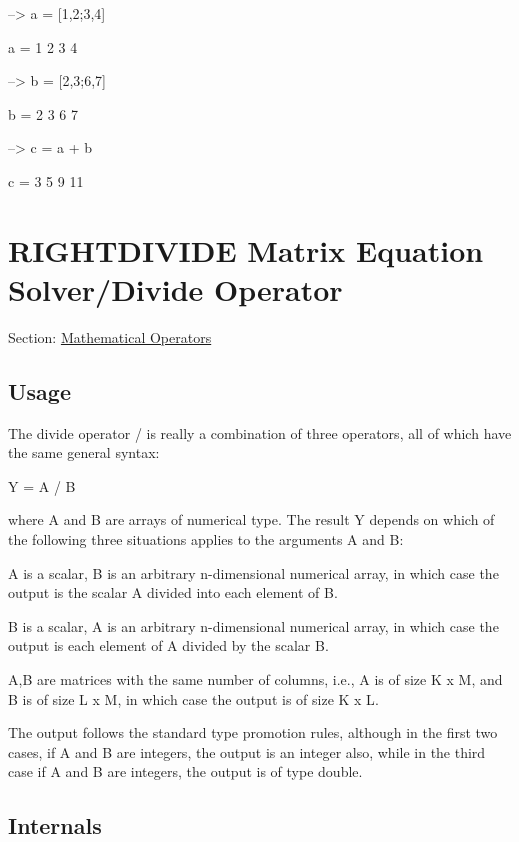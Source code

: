 \begin{DoxyVerbInclude}
--> a = [1,2;3,4]

a = 
 1 2 
 3 4 

--> b = [2,3;6,7]

b = 
 2 3 
 6 7 

--> c = a + b

c = 
  3  5 
  9 11 
\end{DoxyVerbInclude}
 \hypertarget{operators_rightdivide}{}\section{R\-I\-G\-H\-T\-D\-I\-V\-I\-D\-E Matrix Equation Solver/\-Divide Operator}\label{operators_rightdivide}
Section\-: \hyperlink{sec_operators}{Mathematical Operators} \hypertarget{vtkwidgets_vtkxyplotwidget_Usage}{}\subsection{Usage}\label{vtkwidgets_vtkxyplotwidget_Usage}
The divide operator {\ttfamily /} is really a combination of three operators, all of which have the same general syntax\-: \begin{DoxyVerb}  Y = A / B
\end{DoxyVerb}
 where {\ttfamily A} and {\ttfamily B} are arrays of numerical type. The result {\ttfamily Y} depends on which of the following three situations applies to the arguments {\ttfamily A} and {\ttfamily B}\-: 
\begin{DoxyEnumerate}
\item {\ttfamily A} is a scalar, {\ttfamily B} is an arbitrary {\ttfamily n}-\/dimensional numerical array, in which case the output is the scalar {\ttfamily A} divided into each element of {\ttfamily B}.  
\item {\ttfamily B} is a scalar, {\ttfamily A} is an arbitrary {\ttfamily n}-\/dimensional numerical array, in which case the output is each element of {\ttfamily A} divided by the scalar {\ttfamily B}.  
\item {\ttfamily A,B} are matrices with the same number of columns, i.\-e., {\ttfamily A} is of size {\ttfamily K x M}, and {\ttfamily B} is of size {\ttfamily L x M}, in which case the output is of size {\ttfamily K x L}.  
\end{DoxyEnumerate}The output follows the standard type promotion rules, although in the first two cases, if {\ttfamily A} and {\ttfamily B} are integers, the output is an integer also, while in the third case if {\ttfamily A} and {\ttfamily B} are integers, the output is of type {\ttfamily double}.\hypertarget{transforms_svd_Function}{}\subsection{Internals}\label{transforms_svd_Function}
